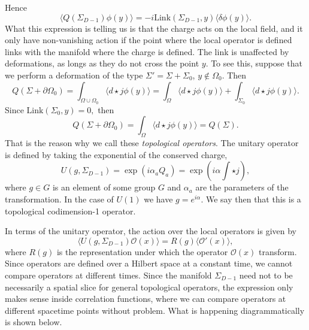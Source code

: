 \documentclass{article}
\begin{document}
Hence
\begin{equation}
	\langle Q(\Sigma_{D-1})\phi(y)\rangle=-i\text{Link}(\Sigma_{D-1},y)\langle\delta\phi(y)\rangle.
\end{equation}
What this expression is telling us is that the charge acts on the local field, and it only have non-vanishing action if the point where the local operator is defined links with the manifold where the charge is defined. The link is unaffected by deformations, as longs as they do not cross the point $y$.  To see this, suppose that we perform a deformation of the type $\Sigma'=\Sigma+\Sigma_0$, $y\not\in\Omega_0.$ Then 
\begin{equation}
	Q(\Sigma+\partial\Omega_0)=\int_{\Omega\cup\Omega_0}\langle d\star j\phi(y)\rangle=\int_{\Omega}\langle d\star j\phi(y)\rangle+\int_{\Sigma_0}\langle d\star j\phi(y)\rangle.
\end{equation}
Since $\text{Link}(\Sigma_0,y)=0,$ then
\begin{equation}
	Q(\Sigma+\partial\Omega_0)=\int_{\Omega}\langle d\star j\phi(y)\rangle=Q(\Sigma).
\end{equation}
That is the reason why we call these \textit{topological operators}. The unitary operator is defined by taking the exponential of the conserved charge,
\begin{equation}
	U(g,\Sigma_{D-1})=\exp(i\alpha_aQ_a)=\exp\left(i\alpha\int\star j\right),
\end{equation}
where $g\in G$  is an element of some group $G$ and $\alpha_a$ are the parameters of the transformation. In the case of  $U(1)$  we have $g=e^{i\alpha}$.  We say then that this is a topological codimension-1 operator. 

In terms of the unitary operator, the action over the local operators is given by
\begin{equation}
	\langle U(g,\Sigma_{D-1})\mathcal{O}(x)\rangle=R(g)\langle\mathcal{O}'(x)\rangle,
\end{equation}
where $R(g)$ is the representation under which the operator $\mathcal{O}(x)$ transform. 
Since operators are defined over a Hilbert space at a constant time, we cannot compare operators at different times. Since the manifold $\Sigma_{D-1}$ need not to be necessarily a spatial slice for general topological operators, the expression only makes sense inside correlation functions, where we can compare operators at different spacetime points without problem. What is happening diagrammatically is shown below. 
\end{document}
